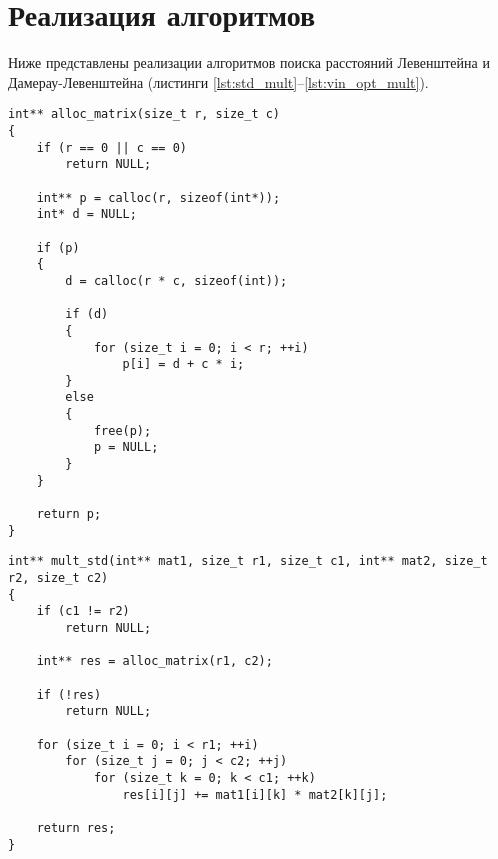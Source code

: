 \section{Реализация алгоритмов}

Ниже представлены реализации алгоритмов поиска расстояний Левенштейна и Дамерау-Левенштейна
(листинги \ref{lst:std_mult}--\ref{lst:vin_opt_mult}).

\begin{center}
	\captionsetup{justification=centering, singlelinecheck=off}
	\begin{lstlisting}[label=lst:alloc_matrix, caption=Алгоритм создания матрицы и заполнения ее нулями]
int** alloc_matrix(size_t r, size_t c)
{
    if (r == 0 || c == 0)
        return NULL;

    int** p = calloc(r, sizeof(int*));
    int* d = NULL;

    if (p)
    {
        d = calloc(r * c, sizeof(int));

        if (d)
        {
            for (size_t i = 0; i < r; ++i)
                p[i] = d + c * i;
        }
        else
        {
            free(p);
            p = NULL;
        }
    }

    return p;
}
    \end{lstlisting}
\end{center}

\begin{center}
	\captionsetup{justification=centering, singlelinecheck=off}
	\begin{lstlisting}[label=lst:std_mult, caption=Алгоритма стандартного умножения матриц]
int** mult_std(int** mat1, size_t r1, size_t c1, int** mat2, size_t r2, size_t c2)
{
    if (c1 != r2)
        return NULL;

    int** res = alloc_matrix(r1, c2);
    
    if (!res)
        return NULL;

    for (size_t i = 0; i < r1; ++i)
        for (size_t j = 0; j < c2; ++j)
            for (size_t k = 0; k < c1; ++k)
                res[i][j] += mat1[i][k] * mat2[k][j];

    return res;
}
	\end{lstlisting}
\end{center}

